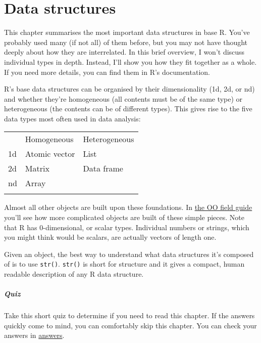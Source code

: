 \chapter{Data structures}\label{data-structures}

This chapter summarises the most important data structures in base R.
You've probably used many (if not all) of them before, but you may not
have thought deeply about how they are interrelated. In this brief
overview, I won't discuss individual types in depth. Instead, I'll show
you how they fit together as a whole. If you need more details, you can
find them in R's documentation.

R's base data structures can be organised by their dimensionality (1d,
2d, or nd) and whether they're homogeneous (all contents must be of the
same type) or heterogeneous (the contents can be of different types).
This gives rise to the five data types most often used in data analysis:

\begin{longtable}[c]{@{}lll@{}}
\toprule\addlinespace
& Homogeneous & Heterogeneous
\\\addlinespace
\midrule\endhead
1d & Atomic vector & List
\\\addlinespace
2d & Matrix & Data frame
\\\addlinespace
nd & Array &
\\\addlinespace
\bottomrule
\end{longtable}

Almost all other objects are built upon these foundations. In
\hyperref[oo-field-guide]{the OO field guide} you'll see how more
complicated objects are built of these simple pieces. Note that R has
0-dimensional, or scalar types. Individual numbers or strings, which you
might think would be scalars, are actually vectors of length one.

Given an object, the best way to understand what data structures it's
composed of is to use \texttt{str()}. \texttt{str()} is short for
structure and it gives a compact, human readable description of any R
data structure.

\paragraph{Quiz}\label{quiz}

Take this short quiz to determine if you need to read this chapter. If
the answers quickly come to mind, you can comfortably skip this chapter.
You can check your answers in
\hyperref[data-structure-answers]{answers}.

